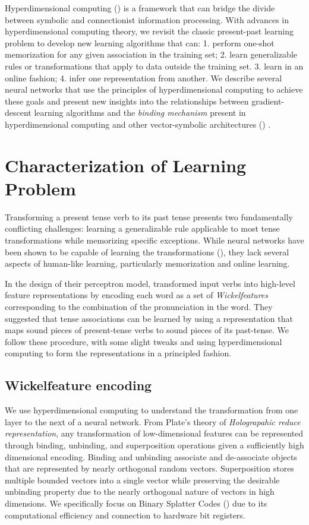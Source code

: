 \documentclass{article}
\begin{document}
Hyperdimensional computing (\citet{Kanerva2009}) is a framework that can bridge the divide between symbolic and connectionist information processing. With advances in hyperdimensional computing theory, we revisit the classic present-past learning problem to develop new learning algorithms that can: 1. perform one-shot memorization for any given association in the training set; 2. learn generalizable rules or transformations that apply to data outside the training set. 3. learn in an online fashion; 4. infer one representation from another. We describe several neural networks that use the principles of hyperdimensional computing to achieve these goals and present new insights into the relationships between gradient-descent learning algorithms and the \emph{binding mechanism} present in hyperdimensional computing and other vector-symbolic architectures (\citet{Gayler2003}) .

\section{Characterization of Learning Problem}

Transforming a present tense verb to its past tense presents two fundamentally conflicting challenges: learning a generalizable rule applicable to most tense transformations while memorizing specific exceptions. While neural networks have been shown to be capable of learning the transformations (\citet{MacWhinney1991}), they lack several aspects of human-like learning, particularly memorization and online learning. 

In the design of their perceptron model, \citet{Rumelhart1986} transformed input verbs into high-level feature representations by encoding each word as a set of \emph{Wickelfeatures} corresponding to the combination of the pronunciation in the word. They suggested that tense associations can be learned by using a representation that maps sound pieces of present-tense verbs to sound pieces of its past-tense. We follow these procedure, with some slight tweaks and using hyperdimensional computing to form the representations in a principled fashion.

\subsection{Wickelfeature encoding}

We use hyperdimensional computing to understand the transformation from one layer to the next of a neural network. From Plate's theory of \emph{Holograpahic reduce representation}, any transformation of low-dimensional features can be represented through binding, unbinding, and superposition operations given a sufficiently high dimensional encoding. Binding and unbinding associate and de-associate objects that are represented by nearly orthogonal random vectors. Superposition stores multiple bounded vectors into a single vector while preserving the desirable unbinding property due to the nearly orthogonal nature of vectors in high dimensions. We specifically focus on Binary Splatter Codes (\citet{Kanerva1994}) due to its computational efficiency and connection to hardware bit registers.
\end{document}
